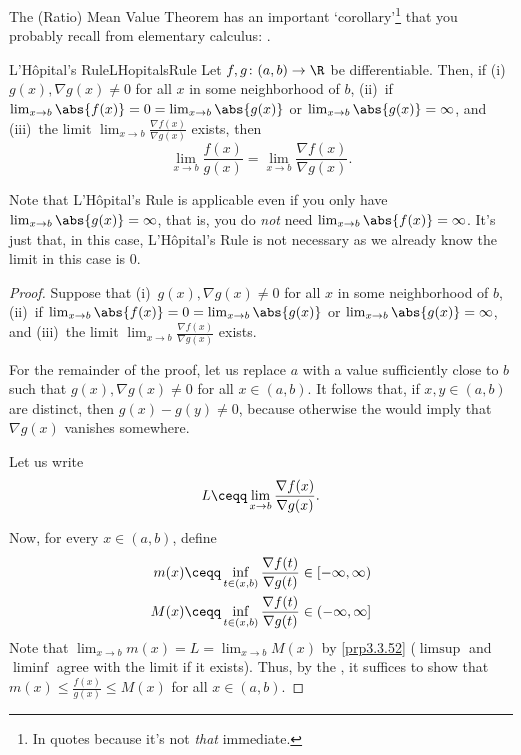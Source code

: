 The (Ratio) Mean Value Theorem has an important `corollary'\footnote{In quotes because it's not \emph{that} immediate.} that you probably recall from elementary calculus:  .
\begin{thm}{L'Hôpital's Rule}{LHopitalsRule}
Let $f,g\colon (a,b)\rightarrow \R$ be differentiable.  Then, if (i)~$g(x),\nabla g(x)\neq 0$ for all $x$ in some neighborhood of $b$, (ii)~if $\lim _{x\to b}\abs{f(x)}=0=\lim _{x\to b}\abs{g(x)}$ or $\lim _{x\to b}\abs{g(x)}=\infty$, and (iii)~the limit $\lim _{x\to b}\frac{\nabla f(x)}{\nabla g(x)}$ exists, then
\begin{equation}
\lim _{x\to b}\frac{f(x)}{g(x)}=\lim _{x\to b}\frac{\nabla f(x)}{\nabla g(x)}.
\end{equation}
\begin{rmk}
Note that L'Hôpital's Rule is applicable even if you only have $\lim _{x\to b}\abs{g(x)}=\infty$, that is, you do \emph{not} need $\lim _{x\to b}\abs{f(x)}=\infty$.  It's just that, in this case, L'Hôpital's Rule is not necessary as we already know the limit in this case is $0$.
\end{rmk}
\begin{proof}
Suppose that (i)~$g(x),\nabla g(x)\neq 0$ for all $x$ in some neighborhood of $b$, (ii)~if $\lim _{x\to b}\abs{f(x)}=0=\lim _{x\to b}\abs{g(x)}$ or $\lim _{x\to b}\abs{g(x)}=\infty$, and (iii)~the limit $\lim _{x\to b}\frac{\nabla f(x)}{\nabla g(x)}$ exists.

For the remainder of the proof, let us replace $a$ with a value sufficiently close to $b$ such that $g(x),\nabla g(x)\neq 0$ for all $x\in (a,b)$.  It follows that, if $x,y\in (a,b)$ are distinct, then $g(x)-g(y)\neq 0$, because otherwise the  would imply that $\nabla g(x)$ vanishes somewhere.

Let us write
\begin{equation}
L\ceqq \lim _{x\to b}\frac{\nabla f(x)}{\nabla g(x)}.
\end{equation}

Now, for every $x\in (a,b)$, define
\begin{align}
m(x) & \ceqq \inf _{t\in (x,b)}\frac{\nabla f(t)}{\nabla g(t)}\in [-\infty ,\infty ) \\
M(x) & \ceqq \inf _{t\in (x,b)}\frac{\nabla f(t)}{\nabla g(t)}\in (-\infty ,\infty ]
\end{align}
Note that $\lim _{x\to b}m(x)=L=\lim _{x\to b}M(x)$ by \cref{prp3.3.52} ($\limsup$ and $\liminf$ agree with the limit if it exists).  Thus, by the , it suffices to show that $m(x)\leq \frac{f(x)}{g(x)}\leq M(x)$ for all $x\in (a,b)$.


\end{proof}
\end{thm}
